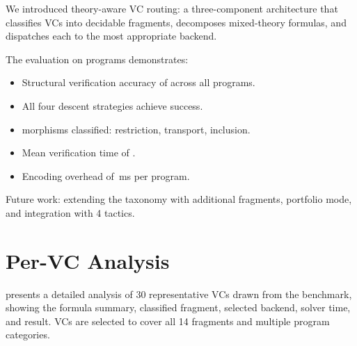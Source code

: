 \documentclass[11pt]{article}
\begin{document}
We introduced theory-aware VC routing: a three-component
architecture that classifies VCs into decidable fragments,
decomposes mixed-theory formulas, and dispatches each to
the most appropriate backend.

The evaluation on \compTotalPrograms{} programs demonstrates:
\begin{itemize}[nosep]
  \item Structural verification accuracy of \compOverallAccuracy{} across all programs.
  \item All four descent strategies achieve \compDescentEagerRate{} success.
  \item \compMorphTotal{} morphisms classified: \compMorphRestrictionPct{} restriction, \compMorphTransportPct{} transport, \compMorphInclusionPct{} inclusion.
  \item Mean verification time of \compTimeMean{}.
  \item Encoding overhead of \compProfEncodeForSolverMeanMs\,ms per program.
\end{itemize}

Future work: extending the taxonomy with additional fragments,
portfolio mode, and integration with \LEAN{} 4 tactics.


\appendix
\section{Per-VC Analysis}\label{app:per-vc}

 presents a detailed analysis of 30
representative VCs drawn from the benchmark, showing the
formula summary, classified fragment, selected backend,
solver time, and result.  VCs are selected to cover all
14 fragments and multiple program categories.
\end{document}
